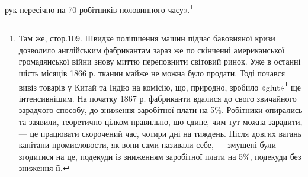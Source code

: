 рук пересічно на 70 робітників половинного часу».\footnote{
Там же, стор.109. Швидке поліпшення машин підчас бавовняної
кризи дозволило англійським фабрикантам зараз же по скінченні американської
громадянської війни знову миттю переповнити світовий ринок.
Уже в останні шість місяців 1866 р. тканин майже не можна було продати.
Тоді почався вивіз товарів у Китай та Індію на комісію, що, природно,
зробило «glut»\footnote*{
— пересичення ринку. Ред.
} ще інтенсивнішим. На початку 1867 р. фабриканти вдалися
до свого звичайного зарадчого способу, до зниження заробітної
плати на 5\%. Робітники опирались та заявили, теоретично цілком правильно,
що єдине, чим тут можна зарадити, — це працювати скорочений
час, чотири дні на тиждень. Після довгих вагань капітани промисловости,
як вони сами називали себе, — змушені були згодитися на це, подекуди
із зниженням заробітної плати на 5\%, подекуди без зниження її.
}

